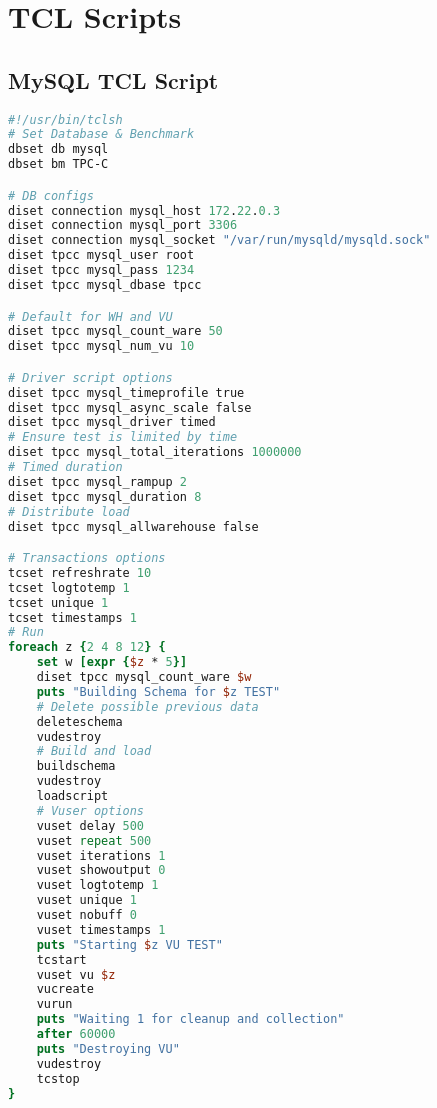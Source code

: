 
\section{TCL Scripts}
\label{sec:tcl-scripts}

\subsection{MySQL TCL Script}
\label{sec:tcl-mysql}

\begin{lstlisting}[language=Tcl, caption={TCL script for MySQL}, label={lst:tcl-mysql}]
#!/usr/bin/tclsh
# Set Database & Benchmark
dbset db mysql
dbset bm TPC-C

# DB configs
diset connection mysql_host 172.22.0.3
diset connection mysql_port 3306
diset connection mysql_socket "/var/run/mysqld/mysqld.sock"
diset tpcc mysql_user root
diset tpcc mysql_pass 1234
diset tpcc mysql_dbase tpcc

# Default for WH and VU
diset tpcc mysql_count_ware 50
diset tpcc mysql_num_vu 10

# Driver script options
diset tpcc mysql_timeprofile true
diset tpcc mysql_async_scale false
diset tpcc mysql_driver timed
# Ensure test is limited by time
diset tpcc mysql_total_iterations 1000000
# Timed duration
diset tpcc mysql_rampup 2
diset tpcc mysql_duration 8
# Distribute load
diset tpcc mysql_allwarehouse false

# Transactions options
tcset refreshrate 10
tcset logtotemp 1
tcset unique 1
tcset timestamps 1
# Run
foreach z {2 4 8 12} {
    set w [expr {$z * 5}]
    diset tpcc mysql_count_ware $w
    puts "Building Schema for $z TEST"
    # Delete possible previous data
    deleteschema
    vudestroy
    # Build and load
    buildschema
    vudestroy
    loadscript
    # Vuser options
    vuset delay 500
    vuset repeat 500
    vuset iterations 1
    vuset showoutput 0
    vuset logtotemp 1
    vuset unique 1
    vuset nobuff 0
    vuset timestamps 1
    puts "Starting $z VU TEST"
    tcstart
    vuset vu $z
    vucreate
    vurun
    puts "Waiting 1 for cleanup and collection"
    after 60000
    puts "Destroying VU"
    vudestroy
    tcstop
}
\end{lstlisting}

